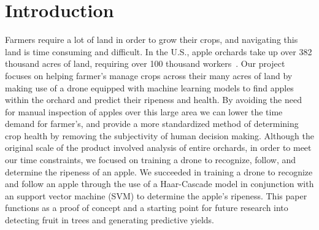\section{Introduction}
Farmers require a lot of land in order to grow their crops, and navigating this land is time consuming and difficult.
In the U.S., apple orchards take up over 382 thousand acres of land, requiring over 100 thousand workers~\cite{USApple}. 
Our project focuses on helping farmer's manage crops across their many acres of land by making use of a drone equipped with machine learning models to 
find apples within the orchard and predict their ripeness and health. By avoiding the need for manual inspection of apples over this large area 
we can lower the time demand for farmer's, and provide a more standardized method of determining crop health by removing the subjectivity of human decision making.
Although the original scale of the product involved analysis of entire orchards, in order to meet our time constraints, we focused on training a drone to recognize, follow, and determine the ripeness of an apple. We succeeded in training a drone to recognize and follow an apple through the use of a Haar-Cascade model in conjunction with an support vector machine (SVM) to determine the apple's ripeness. This paper functions as a proof of concept and a starting point for future research into detecting fruit in trees and generating predictive yields.
\\
